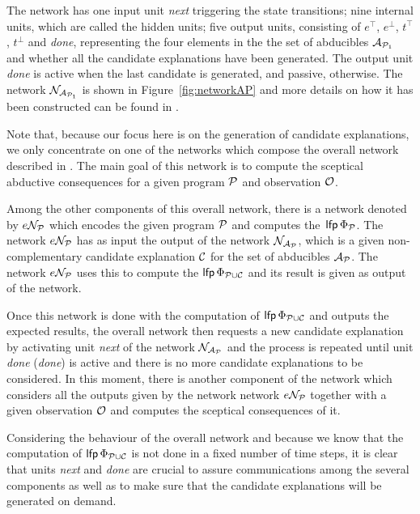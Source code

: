 The network has one input unit \textit{next} triggering the state transitions; nine internal units, which are called the hidden units; five output units, consisting of $e^\top$, $e^\bot$, $t^\top$, $t^\bot$ and \textit{done}, representing the four elements in the the set of abducibles $\mathcal{A}_{\mathcal{P}_1}$ and whether all the candidate explanations have been generated. The output unit \textit{done} is active when the last candidate is generated, and passive, otherwise. The network $\mathcal{N}_{\mathcal{A}_{\mathcal{P}_1}}$ is shown in Figure~\ref{fig:networkAP} and more details on how it has been constructed can be found in \cite{corepaper}. 

Note that, because our focus here is on the generation of candidate explanations, we only concentrate on one of the networks which compose the overall network described in \cite{corepaper}. The main goal of this network is to compute the sceptical abductive consequences for a given program $\mathcal{P}$ and observation $\mathcal{O}$.

Among the other components of this overall network, there is a network denoted by $e\mathcal{N}_{\mathcal{P}}$ which encodes the given program $\mathcal{P}$ and computes the~$\mathsf{lfp}\, \Phi_{\mathcal{P}}$. The network $e\mathcal{N}_{\mathcal{P}}$ has as input the output of the network $\mathcal{N}_{\mathcal{A}_{\mathcal{P}}}$, which is a given non-complementary candidate explanation $\mathcal{C}$ for the set of abducibles $\mathcal{A}_{\mathcal{P}}$. The network $e\mathcal{N}_{\mathcal{P}}$ uses this to compute the $\mathsf{lfp}\, \Phi_{\mathcal{P}\cup\mathcal{C}}$ and its result is given as output of the network. 

Once this network is done with the computation of $\mathsf{lfp}\, \Phi_{\mathcal{P}\cup\mathcal{C}}$ and outputs the expected results, the overall network then requests a new candidate explanation by activating unit \textit{next} of the network $\mathcal{N}_{\mathcal{A}_{\mathcal{P}}}$ and the process is repeated until unit \textit{done} (\textit{done}) is active and there is no more candidate explanations to be considered. In this moment, there is another component of the network which considers all the outputs given by the network network $e\mathcal{N}_{\mathcal{P}}$ together with a given observation $\mathcal{O}$ and computes the sceptical consequences of it.

Considering the behaviour of the overall network and because we know that the computation of $\mathsf{lfp}\, \Phi_{\mathcal{P}\cup\mathcal{C}}$ is not done in a fixed number of time steps, it is clear that units \textit{next} and \textit{done} are crucial to assure communications among the several components as well as to make sure that the candidate explanations will be generated on demand.

